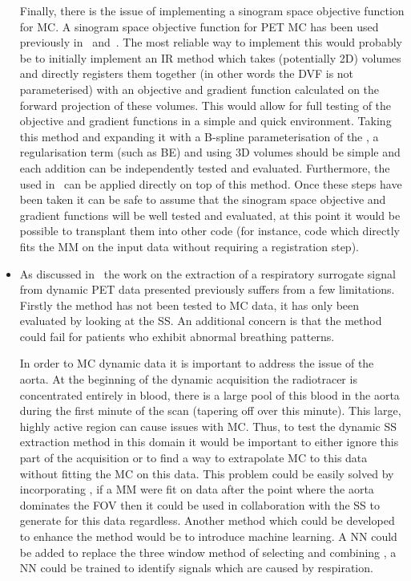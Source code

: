 \begin{itemize}
            Finally, there is the issue of implementing a sinogram space objective function for \gls{MC}. A sinogram space objective function for \gls{PET} \gls{MC} has been used previously in~ and~. The most reliable way to implement this would probably be to initially implement an \gls{IR} method which takes (potentially \gls{2D}) volumes and directly registers them together (in other words the \gls{DVF} is not parameterised) with an objective and gradient function calculated on the forward projection of these volumes. This would allow for full testing of the objective and gradient functions in a simple and quick environment. Taking this method and expanding it with a B-spline parameterisation of the , a regularisation term (such as \gls{BE}) and using \gls{3D} volumes should be simple and each addition can be independently tested and evaluated. Furthermore, the  used in~ can be applied directly on top of this method. Once these steps have been taken it can be safe to assume that the sinogram space objective and gradient functions will be well tested and evaluated, at this point it would be possible to transplant them into other code (for instance, code which directly fits the \gls{MM} on the input data without requiring a registration step).
            
            \item As discussed in~ the work on the extraction of a respiratory surrogate signal from dynamic PET data presented previously suffers from a few limitations. Firstly the method has not been tested to \gls{MC} data, it has only been evaluated by looking at the \gls{SS}. An additional concern is that the method could fail for patients who exhibit abnormal breathing patterns.
            
            In order to \gls{MC} dynamic data it is important to address the issue of the aorta. At the beginning of the dynamic acquisition the radiotracer is concentrated entirely in blood, there is a large pool of this blood in the aorta during the first minute of the scan (tapering off over this minute). This large, highly active region can cause issues with \gls{MC}. Thus, to test the dynamic \gls{SS} extraction method in this domain it would be important to either ignore this part of the acquisition or to find a way to extrapolate \gls{MC} to this data without fitting the \gls{MC} on this data. This problem could be easily solved by incorporating , if a \gls{MM} were fit on data after the point where the aorta dominates the \gls{FOV} then it could be used in collaboration with the \gls{SS} to generate  for this data regardless. Another method which could be developed to enhance the method would be to introduce machine learning. A \gls{NN} could be added to replace the three window method of selecting and combining , a \gls{NN} could be trained to identify signals which are caused by respiration.
        \end{itemize}
        
